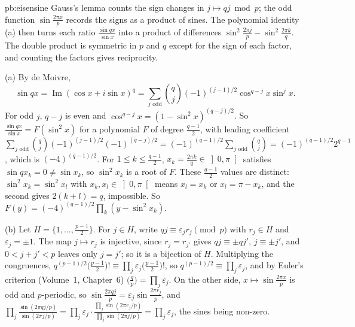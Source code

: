 \begin{solution}{pb:eisensine}
\idea Gauss's lemma counts the sign changes in $j\mapsto qj\bmod p$; the odd function $\sin\frac{2\pi x}p$ records the
signs as a product of sines. The polynomial identity (a) then turns each ratio $\frac{\sin qx}{\sin x}$ into a product of
differences $\sin^2\frac{2\pi j}p-\sin^2\frac{2\pi k}q$. The double product is symmetric in $p$ and $q$ except for the sign
of each factor, and counting the factors gives reciprocity.

\writeup (a) By de Moivre,
\[
\sin qx=\operatorname{Im}(\cos x+i\sin x)^q=\sum_{j\text{ odd}}\binom qj(-1)^{(j-1)/2}\cos^{q-j}x\sin^jx.
\]
For odd $j$, $q-j$ is even and $\cos^{q-j}x=(1-\sin^2x)^{(q-j)/2}$. So $\frac{\sin qx}{\sin x}=F(\sin^2x)$ for a polynomial $F$
of degree $\frac{q-1}2$, with leading coefficient
$\sum_{j\text{ odd}}\binom qj(-1)^{(j-1)/2}(-1)^{(q-j)/2}=(-1)^{(q-1)/2}\sum_{j\text{ odd}}\binom qj=(-1)^{(q-1)/2}2^{q-1}$,
which is $(-4)^{(q-1)/2}$. For $1\le k\le\frac{q-1}2$, $x_k=\frac{2\pi k}q\in\left]0,\pi\right[$ satisfies $\sin qx_k=0\ne\sin x_k$, so
$\sin^2x_k$ is a root of $F$. These $\frac{q-1}2$ values are distinct: $\sin^2x_k=\sin^2x_l$ with $x_k,x_l\in\left]0,\pi\right[$ means
$x_l=x_k$ or $x_l=\pi-x_k$, and the second gives $2(k+l)=q$, impossible. So $F(y)=(-4)^{(q-1)/2}\prod_k(y-\sin^2x_k)$.

(b) Let $H=\{1,\dots,\frac{p-1}2\}$. For $j\in H$, write $qj\equiv\varepsilon_jr_j\pmod p$ with $r_j\in H$ and $\varepsilon_j=\pm1$.
The map $j\mapsto r_j$ is injective, since $r_j=r_{j'}$ gives $qj\equiv\pm qj'$, $j\equiv\pm j'$, and $0<j+j'<p$ leaves
only $j=j'$; so it is a bijection of $H$. Multiplying the congruences, $q^{(p-1)/2}\bigl(\frac{p-1}2\bigr)!\equiv
\prod_j\varepsilon_j\bigl(\frac{p-1}2\bigr)!$, so $q^{(p-1)/2}\equiv\prod_j\varepsilon_j$, and by Euler's criterion (Volume~1, Chapter~6)
$\bigl(\frac qp\bigr)=\prod_j\varepsilon_j$. On the other side, $x\mapsto\sin\frac{2\pi x}p$ is odd and $p$-periodic, so
$\sin\frac{2\pi qj}p=\varepsilon_j\sin\frac{2\pi r_j}p$, and
$\prod_j\frac{\sin(2\pi qj/p)}{\sin(2\pi j/p)}=\prod_j\varepsilon_j\cdot\frac{\prod_j\sin(2\pi r_j/p)}{\prod_j\sin(2\pi j/p)}
=\prod_j\varepsilon_j$, the sines being non-zero.


\end{solution}
